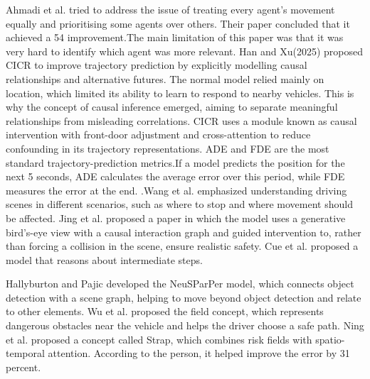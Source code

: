 \documentclass{article}
\begin{document}
Ahmadi et al. tried to address the issue of treating every agent's movement equally and prioritising some agents over others. Their paper concluded that it achieved a 54 improvement.The main limitation of this paper was that it was very hard to identify which agent was more relevant. Han and Xu(2025) proposed CICR to improve trajectory prediction by explicitly modelling causal relationships and alternative futures. The normal model relied mainly on location, which limited its ability to learn to respond to nearby vehicles. This is why the concept of causal inference emerged, aiming to separate meaningful relationships from misleading correlations. CICR uses a module known as causal intervention with front-door adjustment and cross-attention to reduce confounding in its trajectory representations. ADE and FDE are the most standard trajectory-prediction metrics.If a model predicts the position for the next 5 seconds, ADE calculates the average error over this period, while FDE measures the error at the end. .Wang et al. emphasized understanding driving scenes in different scenarios, such as where to stop and where movement should be affected. Jing et al. proposed a paper in which the model uses a generative bird's-eye view with a causal interaction graph and guided intervention to, rather than forcing a collision in the scene, ensure realistic safety. Cue et al. proposed a model that reasons about intermediate steps.

Hallyburton and Pajic developed the NeuSParPer model, which connects object detection with a scene graph, helping to move beyond object detection and relate to other elements. Wu et al. proposed the field concept, which represents dangerous obstacles near the vehicle and helps the driver choose a safe path. Ning et al. proposed a concept called Strap, which combines risk fields with spatio-temporal attention. According to the person, it helped improve the error by 31 percent.
\end{document}

